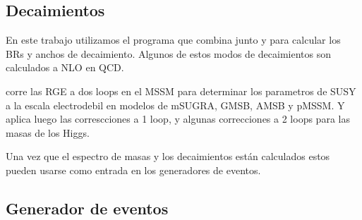 \subsection{Decaimientos}












En este trabajo utilizamos el programa {\susyhit} que combina
{\suspect} junto {\sdecay} y {\hdecay} para calcular los BRs y anchos de
decaimiento. Algunos de estos modos de decaimientos son calculados a NLO en QCD.


{\suspect} corre las RGE a dos loops en el MSSM para determinar
los parametros de SUSY a la escala electrodebil en modelos de mSUGRA, GMSB, AMSB
y pMSSM. Y aplica luego las correscciones a 1 loop, y algunas correcciones a 2 loops
para las masas de los Higgs.

Una vez que el espectro de masas y los decaimientos están calculados estos
pueden usarse como entrada en los generadores de eventos.




\subsection{Generador de eventos}

